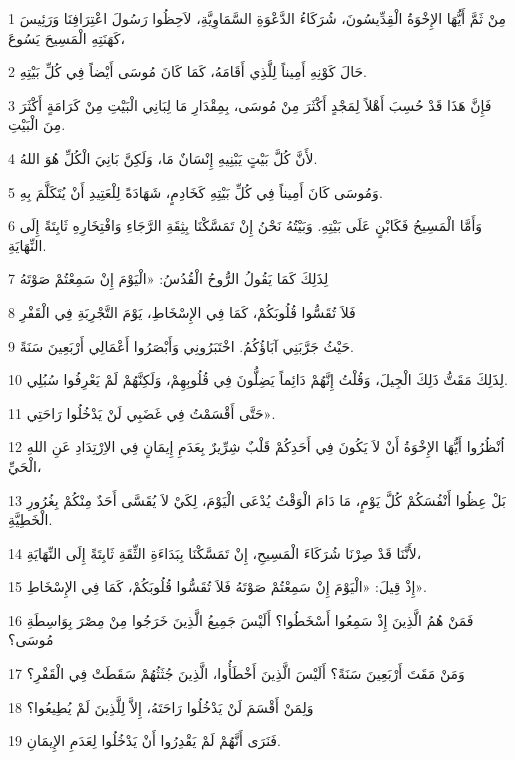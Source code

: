 \par 1 مِنْ ثَمَّ أَيُّهَا الإِخْوَةُ الْقِدِّيسُونَ، شُرَكَاءُ الدَّعْوَةِ السَّمَاوِيَّةِ، لاَحِظُوا رَسُولَ اعْتِرَافِنَا وَرَئِيسَ كَهَنَتِهِ الْمَسِيحَ يَسُوعَ،
\par 2 حَالَ كَوْنِهِ أَمِيناً لِلَّذِي أَقَامَهُ، كَمَا كَانَ مُوسَى أَيْضاً فِي كُلِّ بَيْتِهِ.
\par 3 فَإِنَّ هَذَا قَدْ حُسِبَ أَهْلاً لِمَجْدٍ أَكْثَرَ مِنْ مُوسَى، بِمِقْدَارِ مَا لِبَانِي الْبَيْتِ مِنْ كَرَامَةٍ أَكْثَرَ مِنَ الْبَيْتِ.
\par 4 لأَنَّ كُلَّ بَيْتٍ يَبْنِيهِ إِنْسَانٌ مَا، وَلَكِنَّ بَانِيَ الْكُلِّ هُوَ اللهُ.
\par 5 وَمُوسَى كَانَ أَمِيناً فِي كُلِّ بَيْتِهِ كَخَادِمٍ، شَهَادَةً لِلْعَتِيدِ أَنْ يُتَكَلَّمَ بِهِ.
\par 6 وَأَمَّا الْمَسِيحُ فَكَابْنٍ عَلَى بَيْتِهِ. وَبَيْتُهُ نَحْنُ إِنْ تَمَسَّكْنَا بِثِقَةِ الرَّجَاءِ وَافْتِخَارِهِ ثَابِتَةً إِلَى النِّهَايَةِ.
\par 7 لِذَلِكَ كَمَا يَقُولُ الرُّوحُ الْقُدُسُ: «الْيَوْمَ إِنْ سَمِعْتُمْ صَوْتَهُ
\par 8 فَلاَ تُقَسُّوا قُلُوبَكُمْ، كَمَا فِي الإِسْخَاطِ، يَوْمَ التَّجْرِبَةِ فِي الْقَفْرِ
\par 9 حَيْثُ جَرَّبَنِي آبَاؤُكُمُ. اخْتَبَرُونِي وَأَبْصَرُوا أَعْمَالِي أَرْبَعِينَ سَنَةً.
\par 10 لِذَلِكَ مَقَتُّ ذَلِكَ الْجِيلَ، وَقُلْتُ إِنَّهُمْ دَائِماً يَضِلُّونَ فِي قُلُوبِهِمْ، وَلَكِنَّهُمْ لَمْ يَعْرِفُوا سُبُلِي.
\par 11 حَتَّى أَقْسَمْتُ فِي غَضَبِي لَنْ يَدْخُلُوا رَاحَتِي».
\par 12 اُنْظُرُوا أَيُّهَا الإِخْوَةُ أَنْ لاَ يَكُونَ فِي أَحَدِكُمْ قَلْبٌ شِرِّيرٌ بِعَدَمِ إِيمَانٍ فِي الاِرْتِدَادِ عَنِ اللهِ الْحَيِّ،
\par 13 بَلْ عِظُوا أَنْفُسَكُمْ كُلَّ يَوْمٍ، مَا دَامَ الْوَقْتُ يُدْعَى الْيَوْمَ، لِكَيْ لاَ يُقَسَّى أَحَدٌ مِنْكُمْ بِغُرُورِ الْخَطِيَّةِ.
\par 14 لأَنَّنَا قَدْ صِرْنَا شُرَكَاءَ الْمَسِيحِ، إِنْ تَمَسَّكْنَا بِبَدَاءَةِ الثِّقَةِ ثَابِتَةً إِلَى النِّهَايَةِ،
\par 15 إِذْ قِيلَ: «الْيَوْمَ إِنْ سَمِعْتُمْ صَوْتَهُ فَلاَ تُقَسُّوا قُلُوبَكُمْ، كَمَا فِي الإِسْخَاطِ».
\par 16 فَمَنْ هُمُ الَّذِينَ إِذْ سَمِعُوا أَسْخَطُوا؟ أَلَيْسَ جَمِيعُ الَّذِينَ خَرَجُوا مِنْ مِصْرَ بِوَاسِطَةِ مُوسَى؟
\par 17 وَمَنْ مَقَتَ أَرْبَعِينَ سَنَةً؟ أَلَيْسَ الَّذِينَ أَخْطَأُوا، الَّذِينَ جُثَثُهُمْ سَقَطَتْ فِي الْقَفْرِ؟
\par 18 وَلِمَنْ أَقْسَمَ لَنْ يَدْخُلُوا رَاحَتَهُ، إِلاَّ لِلَّذِينَ لَمْ يُطِيعُوا؟
\par 19 فَنَرَى أَنَّهُمْ لَمْ يَقْدِرُوا أَنْ يَدْخُلُوا لِعَدَمِ الإِيمَانِ.

